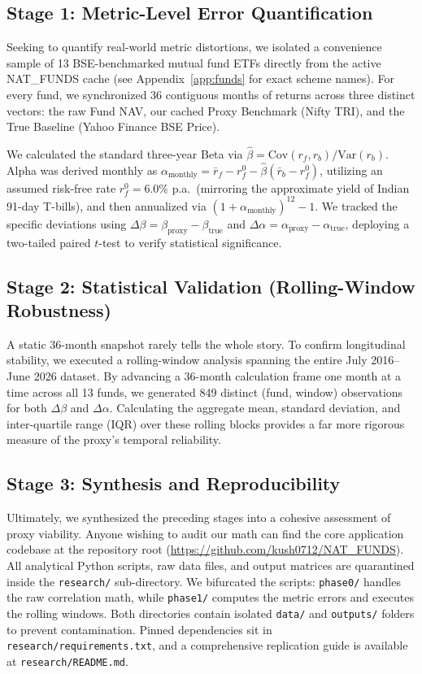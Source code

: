 \documentclass[conference]{IEEEtran}
\begin{document}
\subsection{Stage 1: Metric-Level Error Quantification}
\label{sec:stage1}
Seeking to quantify real-world metric distortions, we isolated a convenience sample of 13 BSE-benchmarked mutual fund ETFs directly from the active NAT\_FUNDS cache (see Appendix~\ref{app:funds} for exact scheme names). For every fund, we synchronized 36 contiguous months of returns across three distinct vectors: the raw Fund NAV, our cached Proxy Benchmark (Nifty TRI), and the True Baseline (Yahoo Finance BSE Price). 

We calculated the standard three-year Beta via $\hat{\beta} = \text{Cov}(r_f, r_b) / \text{Var}(r_b)$. Alpha was derived monthly as $\alpha_\text{monthly} = \bar{r}_f - r_f^0 - \hat{\beta}(\bar{r}_b - r_f^0)$, utilizing an assumed risk-free rate $r_f^0 = 6.0\%$ p.a.\ (mirroring the approximate yield of Indian 91-day T-bills), and then annualized via $(1 + \alpha_\text{monthly})^{12} - 1$. We tracked the specific deviations using $\Delta\beta = \beta_\text{proxy} - \beta_\text{true}$ and $\Delta\alpha = \alpha_\text{proxy} - \alpha_\text{true}$, deploying a two-tailed paired $t$-test to verify statistical significance.

\subsection{Stage 2: Statistical Validation (Rolling-Window Robustness)}
\label{sec:stage2}
A static 36-month snapshot rarely tells the whole story. To confirm longitudinal stability, we executed a rolling-window analysis spanning the entire July 2016--June 2026 dataset. By advancing a 36-month calculation frame one month at a time across all 13 funds, we generated 849 distinct (fund, window) observations for both $\Delta\beta$ and $\Delta\alpha$. Calculating the aggregate mean, standard deviation, and inter-quartile range (IQR) over these rolling blocks provides a far more rigorous measure of the proxy's temporal reliability.

\subsection{Stage 3: Synthesis and Reproducibility}
\label{sec:stage3}
Ultimately, we synthesized the preceding stages into a cohesive assessment of proxy viability. Anyone wishing to audit our math can find the core application codebase at the repository root (\url{https://github.com/kush0712/NAT_FUNDS}). All analytical Python scripts, raw data files, and output matrices are quarantined inside the \texttt{research/} sub-directory. We bifurcated the scripts: \texttt{phase0/} handles the raw correlation math, while \texttt{phase1/} computes the metric errors and executes the rolling windows. Both directories contain isolated \texttt{data/} and \texttt{outputs/} folders to prevent contamination. Pinned dependencies sit in \texttt{research/requirements.txt}, and a comprehensive replication guide is available at \texttt{research/README.md}.
\end{document}
